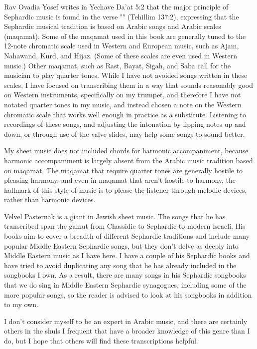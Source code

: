 \documentclass[letterpaper]{memoir}
\begin{document}
Rav Ovadia Yosef writes in Yechave Da'at 5:2 that the major principle of 
Sephardic music is found in the verse 
"" (Tehillim 137:2), expressing that the 
Sephardic musical tradition is based on Arabic songs and Arabic scales 
(maqamat).
Some of the maqamat used in this book are generally tuned to the 12-note chromatic
scale used in Western and European music, such as Ajam, Nahawand, Kurd, and 
Hijaz. (Some of these scales are even used in Western music.)
Other maqamat, such as Rast, Bayat, Sigah, and Saba call for
the musician to play quarter tones. While I have not avoided songs 
written in these scales, I have focused on transcribing them in a way that 
sounds reasonably good on Western instruments, specifically on my trumpet, and 
therefore I have not notated quarter tones in my music, and instead chosen a 
note on the Western chromatic scale that works well enough in practice as a 
substitute. Listening to recordings of these songs, and adjusting the intonation 
by lipping notes up and down, or through use of the valve slides, may help some 
songs to sound better.

My sheet music does not included chords for harmonic accompaniment, because 
harmonic accompaniment is largely absent from the Arabic music tradition based
on maqamat. The maqamat that require quarter tones are generally hostile to 
pleasing harmony, and even in maqamat that aren't hostile to harmony, the 
hallmark of this style of music is to please the listener through melodic 
devices, rather than harmonic devices. 

Velvel Pasternak is a giant in Jewish sheet music. The songs that he has 
transcribed span the gamut from Chassidic to Sephardic to modern 
Israeli. His books aim to cover a breadth of different Sephardic 
traditions and include many popular Middle Eastern Sephardic songs, but 
they don't delve as deeply into Middle Eastern music as I have here.
I have a couple of his Sephardic books and have tried to avoid 
duplicating any song that he has already included in the songbooks I 
own.
As a result, there are many songs in his Sephardic songbooks 
that we do sing in Middle Eastern Sephardic synagogues, including some 
of the more popular songs, so the reader is advised to look at his 
songbooks in addition to my own.

I don't consider myself to be an expert in Arabic music, and there are 
certainly others in the shuls I frequent that have a broader knowledge of this 
genre than I do, but I hope that others will find these transcriptions helpful.
\end{document}
